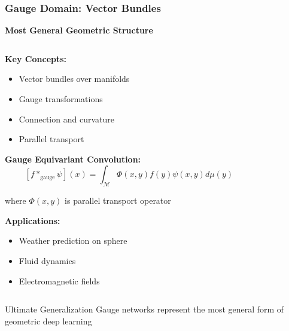 \begin{frame}[fragile]\frametitle{Gauge Domain: Vector Bundles}

\begin{center}
\textbf{Most General Geometric Structure}
\end{center}

\begin{columns}
\begin{column}{0.6\textwidth}
\textbf{Key Concepts:}
\begin{itemize}
\item Vector bundles over manifolds
\item Gauge transformations
\item Connection and curvature
\item Parallel transport
\end{itemize}

\vspace{0.5cm}
\textbf{Gauge Equivariant Convolution:}
$$[f *_{\text{gauge}} \psi](x) = \int_{\mathcal{M}} \Phi(x,y) f(y) \psi(x,y) d\mu(y)$$

where $\Phi(x,y)$ is parallel transport operator

\textbf{Applications:}
\begin{itemize}
\item Weather prediction on sphere
\item Fluid dynamics
\item Electromagnetic fields
\end{itemize}
\end{column}
\begin{column}{0.4\textwidth}

\end{column}
\end{columns}

\begin{alertblock}{Ultimate Generalization}
Gauge networks represent the most general form of geometric deep learning
\end{alertblock}

\end{frame}

